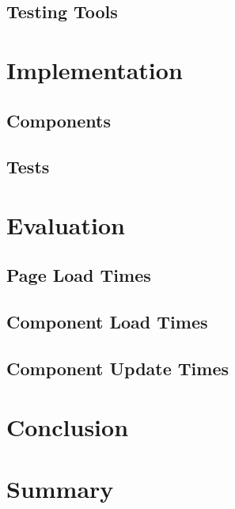 \documentclass[a4paper, fontsize=11pt]{article}
\begin{document}
\subsection{Testing Tools}\label{subsec:testingtools}

\section{Implementation}\label{sec:implementation}
\subsection{Components}\label{subsec:components}
\subsection{Tests}\label{subsec:tests}

\section{Evaluation}\label{sec:evaluation}
\subsection{Page Load Times}\label{subsec:pageloadtimes}
\subsection{Component Load Times}\label{subsec:componentloadtimes}
\subsection{Component Update Times}\label{subsec:componentupdatetimes}

\section{Conclusion}\label{sec:conclustion}
\section{Summary}\label{sec:summary}

\pagebreak



\nocite{*}
{}
\end{document}
